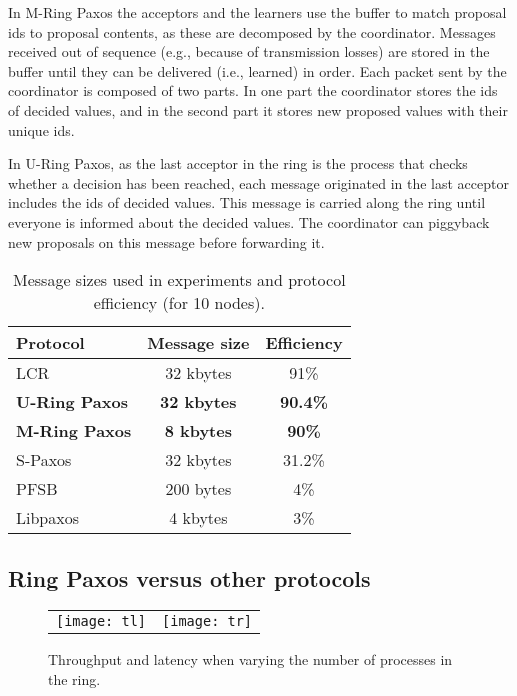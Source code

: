 \documentclass[final,3p,times,twocolumn,authoryear]{elsarticle}
\begin{document}
In M-Ring Paxos the acceptors and the learners use the buffer to match proposal ids to proposal contents, as these are decomposed by the coordinator. Messages received out of sequence (e.g., because of transmission losses) are stored in the buffer until they can be delivered (i.e., learned) in order.
Each packet sent by the coordinator is composed of two parts. In one part the coordinator stores the ids of decided values, and in the second part it stores new proposed values with their unique ids. 


In U-Ring Paxos, as the last acceptor in the ring is the process that checks whether a decision has been reached, each message originated in the last acceptor includes the ids of decided values. This message is carried along the ring until everyone is informed about the decided values. The coordinator can piggyback new proposals on this message before forwarding it. 


\begin{table}[h]
\center
\caption{Message sizes used in experiments and protocol efficiency (for 10 nodes).}\vspace{4mm}
\label{table:mte}
\begin{tabular}{l|c|c} \hline
Protocol            		& Message size & Efficiency \\ \hline
LCR				& 32 kbytes 	& 91\% \\
\bf{U-Ring Paxos}	& \bf{32 kbytes}	& \bf{90.4}\% \\
\bf{M-Ring Paxos}	& \bf{8 kbytes}	& \bf{90}\% \\
S-Paxos	& 32 kbytes	& 31.2\% \\
PFSB			& 200 bytes	& 4\% \\ 
Libpaxos			& 4 kbytes		& 3\% \\ \hline
\end{tabular}


\end{table}

\subsection{Ring Paxos versus other protocols}
\label{sec:rpaxosothers}

\begin{figure*}
  \begin{center}
    \begin{tabular}{c@{}c}
      \texttt{[image: tl]} &
      \texttt{[image: tr]} \\


    \end{tabular}
\caption{Throughput and latency when varying the number of processes in the ring.}
    \label{fig:acceptors}
  \end{center}
\end{figure*}
\end{document}
